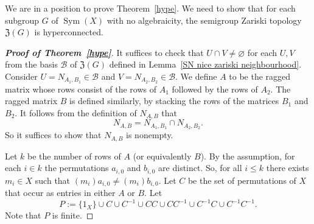 \documentclass[11pt]{amsart}
\makeatletter
\newtheorem{theorem}{Theorem}[section]
\theoremstyle{definition}
\newcommand{\N}{\mathbb N}
\newcommand{\Sym}{\operatorname{Sym}}
\newcommand{\makeset}[2]{\left\lbrace #1 \;\middle|\;
 \begin{tabular}{@{}l@{}}
   #2
  \end{tabular}
  \right\rbrace}
\makeatother
\begin{document}
We are in a position to prove Theorem~\ref{hype}. We need to show that for each subgroup $G$ of $\Sym(X)$ with no algebraicity, the semigroup Zariski topology $\mathfrak Z(G)$ is hyperconnected.

\begin{proof}[{\bf Proof of Theorem~\ref{hype}}]
It suffices to check that $U\cap V\neq \varnothing$ for each $U,V$ from the basis $\mathcal B$ of $\mathfrak{Z}(G)$ defined in Lemma~\ref{SN nice zariski neighbourhood}.
Consider \(U=N_{A_1, B_1}\in \mathcal B\) and \(V=N_{A_2, B_2}\in\mathcal B\).
We define \(A\) to be the ragged matrix whose rows consist of the rows of \(A_1\) followed by the rows of \(A_2\). The ragged matrix $B$ is defined similarly, by stacking the rows of the matrices $B_1$ and $B_2$. It follows from the definition of \(N_{A, B}\) that 
\[N_{A, B}=N_{A_1, B_1}\cap N_{A_2, B_2}.\]
So it suffices to show that \(N_{A, B}\) is nonempty.



Let \(k\) be the number of rows of \(A\) (or equivalently \(B\)).
By the assumption, for each $i\in k$ the permutations $a_{i, 0}$ and $b_{i, 0}$ are distinct. So, for all \(i\leq k\) there exists \(m_i \in X\) such that \((m_i)a_{i, 0}\neq (m_i)b_{i, 0}\).
Let \(C\) be the set of permutations of \(X\) that occur as entries in either \(A\) or \(B\).
Let $$P :=\{1_X\}\cup  C\cup C^{-1} \cup CC\cup CC^{-1}\cup C^{-1}C\cup C^{-1}C^{-1}.$$ 
Note that \(P\) is finite. 


\end{proof}
\end{document}
